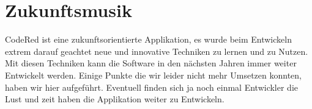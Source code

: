 \chapter{Zukunftsmusik}  %
\label{chapter:Zukunftsmusik}  %

CodeRed ist eine zukunftsorientierte Applikation, es wurde beim Entwickeln extrem darauf geachtet neue und innovative Techniken zu lernen und zu Nutzen. Mit diesen Techniken kann die Software in den nächsten Jahren immer weiter Entwickelt werden. Einige Punkte die wir leider nicht mehr Umsetzen konnten, haben wir hier aufgeführt. Eventuell finden sich ja noch einmal Entwickler die Lust und zeit haben die Applikation weiter zu Entwickeln. \\
\\


